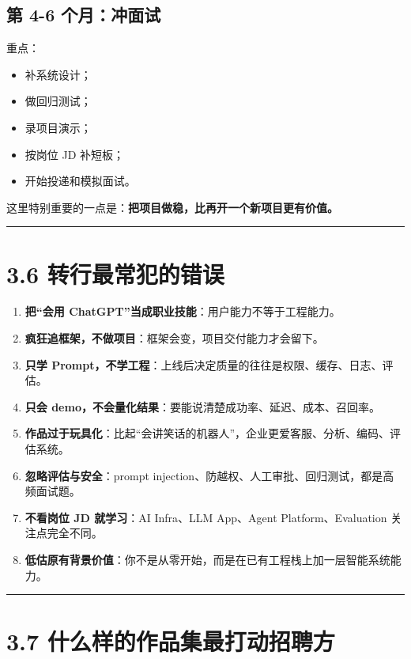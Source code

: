 \subsection{第 4-6 个月：冲面试}

重点：


\begin{itemize}[leftmargin=2em]
\item 补系统设计；
\item 做回归测试；
\item 录项目演示；
\item 按岗位 JD 补短板；
\item 开始投递和模拟面试。
\end{itemize}

这里特别重要的一点是：\textbf{把项目做稳，比再开一个新项目更有价值。}


\bigskip\hrule\bigskip

\section{3.6 转行最常犯的错误}

\begin{enumerate}[leftmargin=2em]
\item \textbf{把``会用 ChatGPT''当成职业技能}：用户能力不等于工程能力。
\item \textbf{疯狂追框架，不做项目}：框架会变，项目交付能力才会留下。
\item \textbf{只学 Prompt，不学工程}：上线后决定质量的往往是权限、缓存、日志、评估。
\item \textbf{只会 demo，不会量化结果}：要能说清楚成功率、延迟、成本、召回率。
\item \textbf{作品过于玩具化}：比起``会讲笑话的机器人''，企业更爱客服、分析、编码、评估系统。
\item \textbf{忽略评估与安全}：prompt injection、防越权、人工审批、回归测试，都是高频面试题。
\item \textbf{不看岗位 JD 就学习}：AI Infra、LLM App、Agent Platform、Evaluation 关注点完全不同。
\item \textbf{低估原有背景价值}：你不是从零开始，而是在已有工程栈上加一层智能系统能力。
\end{enumerate}

\bigskip\hrule\bigskip

\section{3.7 什么样的作品集最打动招聘方}

